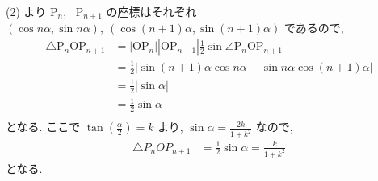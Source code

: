 \documentclass[a4j, 11pt]{jarticle}
\begin{document}
%
%






%
%







%
%






%
%

 (2) より P$_n$, \ P$_{n + 1}$ の座標はそれぞれ $(\cos n \alpha, \sin n \alpha), \ (\cos (n + 1) \alpha, \sin (n + 1) \alpha)$ であるので,
  \begin{align*}
   \triangle \textrm{P}_n \textrm{O} \textrm{P}_{n + 1} &= |\textrm{O} \textrm{P}_n| |\textrm{O} \textrm{P}_{n + 1}| \frac{1}{2} \sin \angle \textrm{P}_n \textrm{O} \textrm{P}_{n + 1} \\
                                   &= \frac{1}{2} \left| \sin (n + 1) \alpha \cos n \alpha - \sin n \alpha \cos (n + 1) \alpha \right| \\
                                   &= \frac{1}{2} \left| \sin \alpha \right| \\
                                   &= \frac{1}{2} \sin \alpha \\
  \end{align*}
 となる. ここで $\displaystyle \tan \left( \frac{\alpha}{2} \right) = k$ より, $\sin \alpha = \displaystyle \frac{2k}{1 + k^2}$ なので, 
  \begin{align*}
   \triangle P_n O P_{n + 1} &= \frac{1}{2} \sin \alpha = \frac{k}{1 + k^2}
  \end{align*}
 となる.

%
%





%
%






%
%
\end{document}
